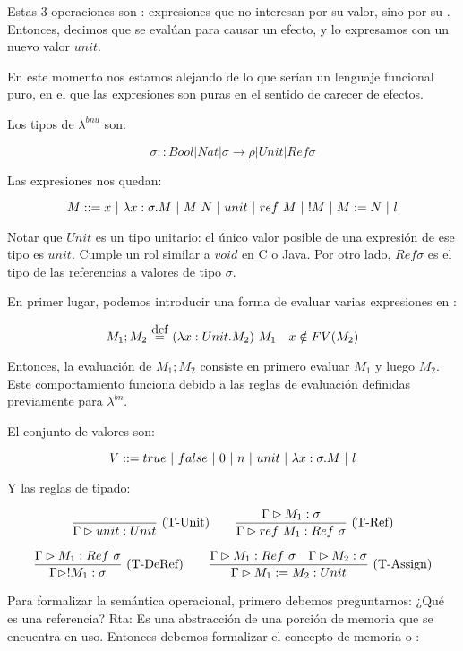 Estas 3 operaciones son : expresiones que no interesan por su valor, sino por su . Entonces, decimos que se evalúan para causar un efecto, y lo expresamos con un nuevo valor $unit$.

En este momento nos estamos alejando de lo que serían un lenguaje funcional puro, en el que las expresiones son puras en el sentido de carecer de efectos.

Los tipos de $\lambda^{bnu}$ son:

\[\sigma :: Bool \vert Nat \vert \sigma\to\rho \vert Unit \vert Ref \sigma \]

Las expresiones nos quedan:

\[M ::= x \ |\  \lambda x:\sigma.M \ |\  M\ N \ |\  unit \ |\  ref\ M \ |\  !M \ |\  M := N \ |\  l \]

Notar que $Unit$ es un tipo unitario: el único valor posible de una expresión de ese tipo es $unit$. Cumple un rol similar a $void$ en C o Java. Por otro lado, $Ref \sigma$ es el tipo de las referencias a valores de tipo $\sigma$.

En primer lugar, podemos introducir una forma de evaluar varias expresiones en :

\[M_1; M_2 \eqdef \app{(\abs{x}{Unit}{M_2})}{M_1}\quad x\notin FV(M_2)\]

Entonces, la evaluación de $M_1; M_2$ consiste en primero evaluar $M_1$  y luego $M_2$. Este comportamiento funciona debido a las reglas de evaluación definidas previamente para $\lambda^{bn}$.

El conjunto de valores son:

\[V ::= true \ |\  false \ |\  0 \ |\  n \ |\  unit \ |\  \lambda x:\sigma.M \ |\  l \]

Y las reglas de tipado:

\[\deriv{}{\Gamma \rhd unit : Unit}{T-Unit}\quad\quad \deriv{\Gtipa{M_1}{\sigma}}{\Gtipa{ref\ M_1}{Ref\ \sigma}}{T-Ref}\]

\[\deriv{\Gtipa{M_1}{Ref\ \sigma}}{\Gtipa{!M_1}{\sigma}}{T-DeRef}\quad\quad \deriv{\Gtipa{M_1}{Ref\ \sigma}\quad \Gtipa{M_2}{\sigma}}{\Gtipa{M_1 := M_2}{Unit}}{T-Assign}\]

Para formalizar la semántica operacional, primero debemos preguntarnos: ¿Qué es una referencia? Rta: Es una abstracción de una porción de memoria que se encuentra en uso. Entonces debemos formalizar el concepto de memoria o :

